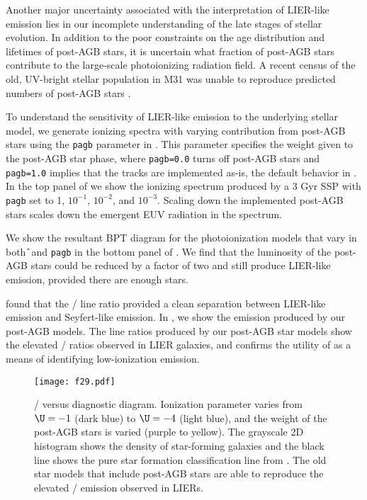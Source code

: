 Another major uncertainty associated with the interpretation of LIER-like emission lies in our incomplete understanding of the late stages of stellar evolution. In addition to the poor constraints on the age distribution and lifetimes of post-AGB stars, it is uncertain what fraction of post-AGB stars contribute to the large-scale photoionizing radiation field. A recent census of the old, UV-bright stellar population in M31 was unable to reproduce predicted numbers of post-AGB stars \citep{Brown2008}. 

To understand the sensitivity of LIER-like emission to the underlying stellar model, we generate ionizing spectra with varying contribution from post-AGB stars using the {\tt pagb} parameter in \FSPS. This parameter specifies the weight given to the post-AGB star phase, where {\tt pagb=0.0} turns off post-AGB stars and {\tt pagb=1.0} implies that the \citet{Vassiliadis} tracks are implemented as-is, the default behavior in \FSPS. In the top panel of  we show the ionizing spectrum produced by a 3 Gyr SSP with {\tt pagb} set to 1, $10^{-1}$, $10^{-2}$, and $10^{-3}$. Scaling down the implemented post-AGB stars scales down the emergent EUV radiation in the spectrum.

We show the resultant BPT diagram for the photoionization models that vary in both \U{} and {\tt pagb} in the bottom panel of . We find that the luminosity of the post-AGB stars could be reduced by a factor of two and still produce LIER-like emission, provided there are enough stars.

\citet{Belfiore16} found that the \sii{}/\ha{} line ratio provided a clean separation between LIER-like emission and Seyfert-like emission. In , we show the \sii{} emission produced by our post-AGB models. The line ratios produced by our post-AGB star models show the elevated \sii{}/\ha{} ratios observed in LIER galaxies, and confirms the utility of \sii{} as a means of identifying low-ionization emission.

\begin{figure}[!htbp]
  \begin{centering}
    \texttt{[image: f29.pdf]}
    \caption{\sii{}/\ha{} versus \oiiihb{} diagnostic diagram. Ionization parameter varies from $\U=-1$ (dark blue) to $\U=-4$ (light blue), and the weight of the post-AGB stars is varied (purple to yellow). The grayscale 2D histogram shows the density of star-forming galaxies and the black line shows the pure star formation classification line from \citet{Kauffmann03a}. The old star models that include post-AGB stars are able to reproduce the elevated \sii{}/\ha{} emission observed in LIERs.}
    \label{fig:lier}
  \end{centering}
\end{figure}

